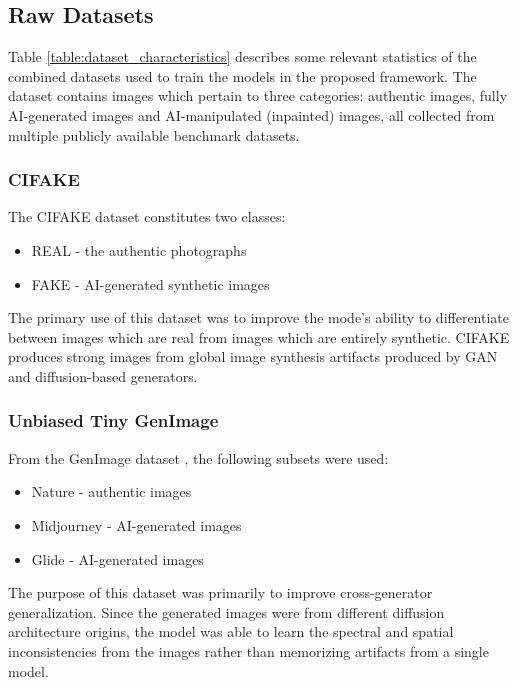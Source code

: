 

\subsection{Raw Datasets} \label{subsection:raw}

Table \ref{table:dataset_characteristics} describes some relevant statistics of
the combined datasets used to train the models in the proposed framework. The
dataset contains images which pertain to three categories: authentic images,
fully AI-generated images and AI-manipulated (inpainted) images, all collected
from multiple publicly available benchmark datasets.



\subsubsection{CIFAKE}
The CIFAKE dataset \cite{bird2023cifake} constitutes two classes:
\begin{itemize}
  \item{REAL - the authentic photographs}
  \item{FAKE - AI-generated synthetic images}
\end{itemize}
The primary use of this dataset was to improve the mode's ability to
differentiate between images which are real from images which are entirely
synthetic. CIFAKE produces strong images from  global image synthesis artifacts
produced by GAN and diffusion-based generators.

\subsubsection{Unbiased Tiny GenImage}
From the GenImage dataset \cite{zhu2023genimage}, the following subsets were
used:
\begin{itemize}
  \item{Nature - authentic images}
  \item{Midjourney - AI-generated images}
  \item{Glide - AI-generated images}
\end{itemize}
The purpose of this dataset was primarily to improve cross-generator
generalization. Since the generated images were from different diffusion
architecture origins, the model was able to learn the spectral and spatial
inconsistencies from the images rather than memorizing artifacts from a single
model.

